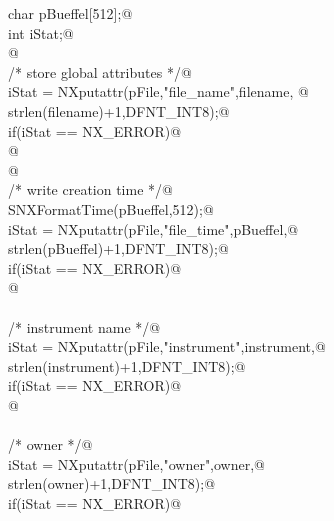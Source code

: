\documentclass[12pt]{article}
\begin{document}
{\begin{flushleft}
\begin{minipage}{\linewidth}
\begin{list}{}{}
\mbox{}\verb@     char pBueffel[512];@\\
\mbox{}\verb@     int iStat;@\\
\mbox{}\verb@     @\\
\mbox{}\verb@     /* store global attributes */@\\
\mbox{}\verb@     iStat = NXputattr(pFile,"file_name",filename, @\\
\mbox{}\verb@                       strlen(filename)+1,DFNT_INT8);@\\
\mbox{}\verb@     if(iStat == NX_ERROR)@\\
\mbox{}@\\
\mbox{}\verb@     @\\
\mbox{}\verb@     /* write creation time */@\\
\mbox{}\verb@     SNXFormatTime(pBueffel,512);@\\
\mbox{}\verb@     iStat = NXputattr(pFile,"file_time",pBueffel,@\\
\mbox{}\verb@                       strlen(pBueffel)+1,DFNT_INT8);@\\
\mbox{}\verb@     if(iStat == NX_ERROR)@\\
\mbox{}@\\
\mbox{}\verb@@\\
\mbox{}\verb@     /* instrument name */@\\
\mbox{}\verb@     iStat = NXputattr(pFile,"instrument",instrument,@\\
\mbox{}\verb@                       strlen(instrument)+1,DFNT_INT8);@\\
\mbox{}\verb@     if(iStat == NX_ERROR)@\\
\mbox{}@\\
\mbox{}\verb@@\\
\mbox{}\verb@     /* owner */@\\
\mbox{}\verb@     iStat = NXputattr(pFile,"owner",owner,@\\
\mbox{}\verb@                       strlen(owner)+1,DFNT_INT8);@\\
\mbox{}\verb@     if(iStat == NX_ERROR)@\\

\end{list}
\end{minipage}
\end{flushleft}}
\end{document}
